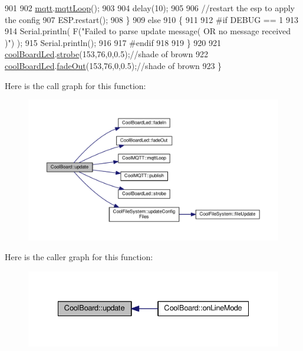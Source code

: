 \begin{DoxyCode}
901             
902             \hyperlink{classCoolBoard_a2399f44d7c23c1149a335cb3b46d90f1}{mqtt}.\hyperlink{classCoolMQTT_aa5eaae967b562b62cbcf2b8d81f6e5d5}{mqttLoop}();
903 
904             delay(10);
905             
906             \textcolor{comment}{//restart the esp to apply the config}
907             ESP.restart();
908     \}
909     \textcolor{keywordflow}{else}
910     \{
911     
912 \textcolor{preprocessor}{    #if DEBUG == 1}
913 
914         Serial.println( F(\textcolor{stringliteral}{"Failed to parse update message( OR no message received )"}) );
915         Serial.println();
916     
917 \textcolor{preprocessor}{    #endif}
918     
919     \}
920 
921     \hyperlink{classCoolBoard_a1b1d3c684a5baa56b08486e192fd8e97}{coolBoardLed}.\hyperlink{classCoolBoardLed_ad5f0de4c628cbfbf49896042831c64ad}{strobe}(153,76,0,0.5);\textcolor{comment}{//shade of brown}
922     \hyperlink{classCoolBoard_a1b1d3c684a5baa56b08486e192fd8e97}{coolBoardLed}.\hyperlink{classCoolBoardLed_a93d545679237e8cc858324367149775c}{fadeOut}(153,76,0,0.5);\textcolor{comment}{//shade of brown                              }
923 \}
\end{DoxyCode}
Here is the call graph for this function\+:
\nopagebreak
\begin{figure}[H]
\begin{center}
\leavevmode
\includegraphics[width=350pt]{classCoolBoard_a8612756d3f73198cdde857a66f0fe690_cgraph}
\end{center}
\end{figure}
Here is the caller graph for this function\+:
\nopagebreak
\begin{figure}[H]
\begin{center}
\leavevmode
\includegraphics[width=335pt]{classCoolBoard_a8612756d3f73198cdde857a66f0fe690_icgraph}
\end{center}
\end{figure}
\mbox{\label{classCoolBoard_ae7358fb6e623cfc81b775f5f1734909b}} 
